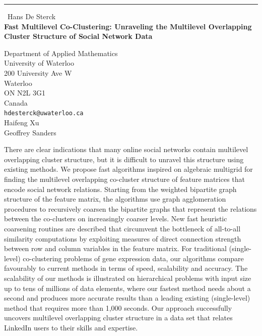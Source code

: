 \documentclass{report}
\begin{document}
\begin{center}
\rule{6in}{1pt} \
{\large Hans De Sterck \\
{\bf Fast Multilevel Co-Clustering: Unraveling the Multilevel Overlapping Cluster Structure of Social Network Data}}

Department of Applied Mathematics \\ University of Waterloo \\ 200 University Ave W \\ Waterloo \\ ON N2L 3G1 \\ Canada
\\
{\tt hdesterck@uwaterloo.ca}\\
Haifeng Xu\\
Geoffrey Sanders\end{center}

There are clear indications that many online social networks contain
multilevel overlapping cluster structure, but it is difficult to unravel
this structure using existing methods. We propose fast algorithms
inspired on algebraic multigrid for finding the multilevel overlapping
co-cluster structure of feature matrices that encode social network
relations. Starting from the weighted bipartite graph structure of the
feature matrix, the algorithms use graph agglomeration procedures to
recursively coarsen the bipartite graphs that represent the relations
between the co-clusters on increasingly coarser levels. New fast
heuristic coarsening routines are described that circumvent the
bottleneck of all-to-all similarity computations by exploiting measures
of direct connection strength between row and column variables in the
feature matrix. For traditional (single-level) co-clustering problems of
gene expression data, our algorithms compare favourably to current
methods in terms of speed, scalability and accuracy. The scalability of
our methods is illustrated on hierarchical problems with input size up to
tens of millions of data elements, where our fastest method needs about a
second and produces more accurate results than a leading existing
(single-level) method that requires more than 1,000 seconds. Our approach
successfully uncovers multilevel overlapping cluster structure in a data
set that relates LinkedIn users to their skills and expertise.
\end{document}
